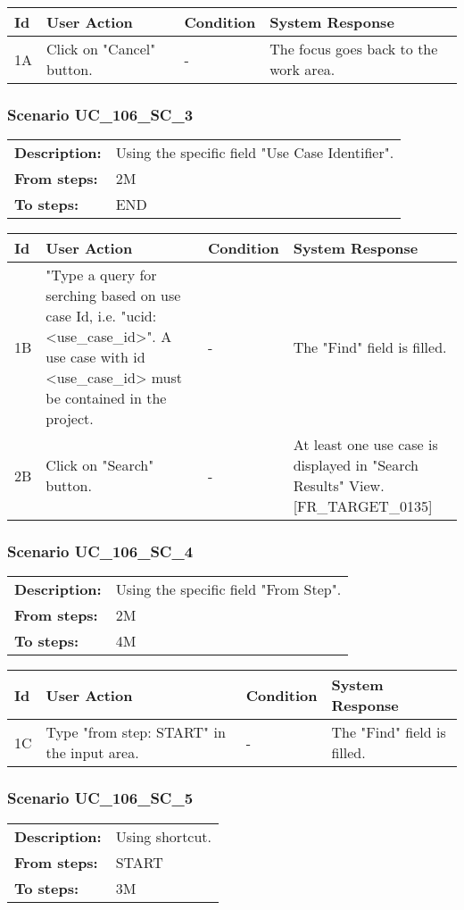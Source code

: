 \documentclass[a4paper,11pt]{article}
\newcommand{\bl}{\\ \hline}
\begin{document}
\begin{tabular}{|p{0.8in}|p{1.6in}|p{1.6in}|p{1.6in}|}
\hline
Id & User Action & Condition & System Response  \bl 
1A & Click on "Cancel" button. & - & The focus goes back to the work area. \bl 
\end{tabular}
\subsubsection*{Scenario UC_106_SC_3}
\begin{tabular}{p{1in}p{4in}}
{\bf Description:} & Using the specific field "Use Case Identifier". \\
{\bf From steps:} & 2M \\
{\bf To steps:} & END \\
\end{tabular}
 
\begin{tabular}{|p{0.8in}|p{1.6in}|p{1.6in}|p{1.6in}|}
\hline
Id & User Action & Condition & System Response  \bl 
1B & "Type a query for serching based on use case Id, i.e. "ucid:<use_case_id>". A use case with id <use_case_id> must be contained in the project. & - & The "Find" field is filled. \bl 
2B & Click on "Search" button. & - & At least one use case is displayed in "Search Results" View.  [FR_TARGET_0135] \bl 
\end{tabular}
\subsubsection*{Scenario UC_106_SC_4}
\begin{tabular}{p{1in}p{4in}}
{\bf Description:} & Using the specific field "From Step". \\
{\bf From steps:} & 2M \\
{\bf To steps:} & 4M \\
\end{tabular}
 
\begin{tabular}{|p{0.8in}|p{1.6in}|p{1.6in}|p{1.6in}|}
\hline
Id & User Action & Condition & System Response  \bl 
1C & Type "from step: START" in the input area. & - & The "Find" field is filled. \bl 
\end{tabular}
\subsubsection*{Scenario UC_106_SC_5}
\begin{tabular}{p{1in}p{4in}}
{\bf Description:} & Using shortcut. \\
{\bf From steps:} & START \\
{\bf To steps:} & 3M \\
\end{tabular}
 
\end{document}
